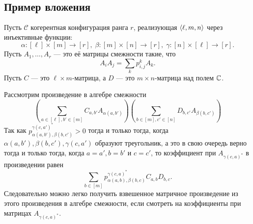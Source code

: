 \subsection{Пример вложения}

Пусть $\mathscr{C}$ когерентная конфигурация ранга $r$, реализующая $\left\langle \ell, m, n \right\rangle$ через инъективные функции:
\[
	\alpha: [\ell] \times [m] \to [r], \; \beta: [m] \times [n] \to [r], \; \gamma: [n] \times [\ell] \to [r].
\]
Пусть $A_1, \dotsc, A_r$ --- это её матрицы смежности такие, что
\[
	A_i A_j = \sum_{k} p_{i,j}^k A_k.
\]
Пусть $C$ --- это $\ell \times m$-матрица, а $D$ --- это $m \times n$-матрица над полем $\mathbb{C}$. 

Рассмотрим произведение в алгебре смежности
\[
	\left( \sum_{a \in [\ell], b' \in [m]} C_{a, b'} A_{\alpha(a, b')} \right) \left( \sum_{b \in [m], c' \in [n]} D_{b, c'} A_{\beta(b, c')}  \right)
\]
Так как $p_{\alpha(a, b'), \beta(b, c')}^{\gamma(c, a')^*} > 0$ тогда и только тогда, когда $\alpha(a,b'), \beta(b,c'), \gamma(c,a')$ образуют треугольник, а это в свою очередь верно тогда и только тогда, когда $a=a', b=b'$ и $c=c'$, то коэффициент при $A_{\gamma(c, a)^*}$ в произведении равен 
\[
	\sum_{b \in [m]} p_{\alpha(a, b), \beta(b, c)}^{\gamma(c, a)^*} C_{a, b} D_{b, c}.
\]
Следовательно можно легко получить взвешенное матричное произведение из этого произведения в алгебре смежности, если смотреть на коэффициенты при матрицах $A_{\gamma(c, a)^*}$.

